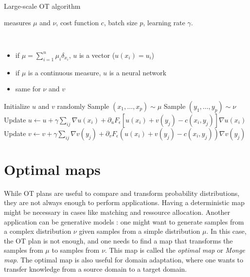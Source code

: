 \documentclass[a4paper,11pt]{article}
\newcommand{\1}{\mathbbm{1}}
\newcommand{\algorithmicparameter}{\textbf{Parameterization:}}
\newcommand{\PARAMETER}{\item[\algorithmicparameter]}  %
\begin{document}
\begin{algorithm}[H]
    \caption{Large-scale OT algorithm}
    \label{alg:large_scale_ot}
    \begin{algorithmic}
        \Require measures $\mu$ and $\nu$, cost function $c$, batch size $p$, learning rate $\gamma$.
        \PARAMETER \\ \begin{itemize}
            \item if $\mu = \sum\limits_{i=1}^{n} \mu_i \delta_{x_i}$, $u$ is a vector ($u(x_i) = u_i$)
            \item if $\mu$ is a continuous measure, $u$ is a neural network
            \item same for $\nu$ and $v$
        \end{itemize}
        \State Initialize $u$ and $v$ randomly
            \State Sample $(x_1, \ldots, x_p) \sim \mu$
            \State Sample $(y_1, \ldots, y_p) \sim \nu$
            \State Update $u \leftarrow u + \gamma \sum\limits_{ij} \nabla u(x_i) + \partial_u F_{\epsilon}[u(x_i) + v(y_j) - c(x_i, y_j)] \nabla u(x_i)$
            \State Update $v \leftarrow v + \gamma \sum\limits_{ij} \nabla v(y_j) + \partial_v F_{\epsilon}(u(x_i) + v(y_j) - c(x_i, y_j)) \nabla v(y_j)$
        \EndWhile
    \end{algorithmic}
\end{algorithm}

\section{Optimal maps}
\label{sec:optimal_maps}

\paragraph{}While OT plans are useful to compare and transform probability distributions, they are not always enough to perform applications. Having a deterministic map might be necessary in cases like matching and ressource allocation. Another application can be generative models : one might want to generate samples from a complex distribution $\nu$ given samples from a simple distribution $\mu$. In this case, the OT plan is not enough, and one needs to find a map that transforms the samples from $\mu$ to samples from $\nu$. This map is called the \emph{optimal map} or \emph{Monge map}. The optimal map is also useful for domain adaptation, where one wants to transfer knowledge from a source domain to a target domain.
\end{document}
